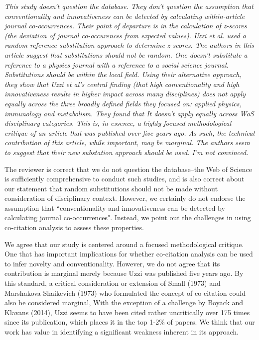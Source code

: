 \documentclass[11pt, oneside]{article}   	%
\begin{document}
\emph{ This study doesn't question the database. They don't question the assumption that conventionality and innovativeness can be detected by calculating within-article journal co-occurrences. Their point of departure is in the calculation of z-scores (the deviation of journal co-occurences from expected values). Uzzi et al. used a random reference substitution approach to determine z-scores. The authors in this article suggest that substitutions should not be random.  One doesn't substitute a reference to a physics journal with a reference to a social science journal.  Substitutions should be within the local field.  Using their alternative approach, they show that Uzzi et al's central finding (that high conventionality and high innovativeness results in higher impact across many disciplines) does not apply equally across the three broadly defined fields they focused on: applied physics, immunology and metabolism. They found that It doesn't apply equally across WoS disciplinary categories. This is, in essence, a highly focused methodological critique of an article that was published over five years ago.  As such, the technical contribution of this article, while important, may be marginal. The authors seem to suggest that their new substation approach should be used. I'm not convinced.}

The reviewer is correct that we do not question the database--the Web of Science is sufficiently comprehensive to conduct such studies, and is also correct about our statement that  random substitutions should not be made without consideration of  disciplinary context. However,  we certainly do not endorse  the assumption that  ``conventionality  and innovativeness can be detected by calculating journal co-occurrences". Instead, we point out the challenges in using co-citation analysis to assess these properties. 

We agree that our study is centered around a focused methodological critique. One that has important implications for whether co-citation analysis can be used to infer novelty and conventionality. However, we do not agree that its contribution is marginal merely because Uzzi was published five years ago. By this standard, a critical consideration or extension of Small (1973) and Marshakova-Shaikevich (1973) who formulated the concept of co-citation could also be considered marginal, With the exception of a challenge by Boyack and Klavans (2014), Uzzi seems to have been cited rather uncritically over 175 times since its publication, which places it in the top 1-2\% of papers. We think that our work has value in identifying a significant weakness inherent in its approach.
\end{document}
